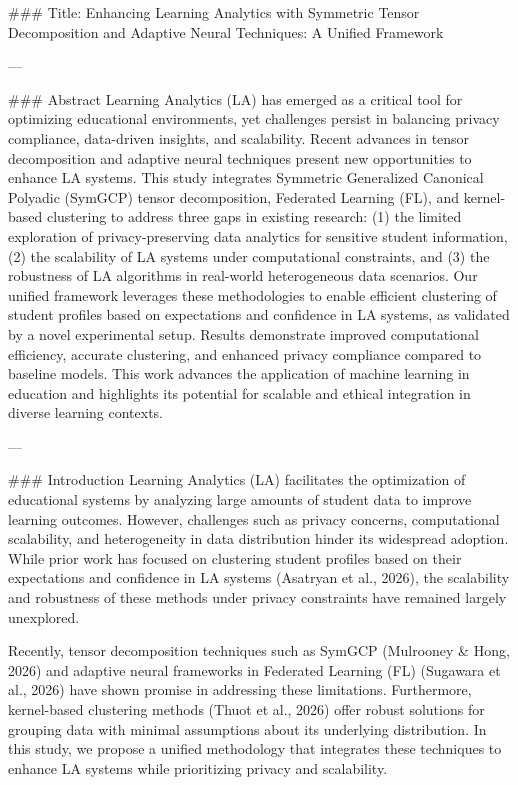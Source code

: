 ### Title: Enhancing Learning Analytics with Symmetric Tensor Decomposition and Adaptive Neural Techniques: A Unified Framework

---

### Abstract
Learning Analytics (LA) has emerged as a critical tool for optimizing educational environments, yet challenges persist in balancing privacy compliance, data-driven insights, and scalability. Recent advances in tensor decomposition and adaptive neural techniques present new opportunities to enhance LA systems. This study integrates Symmetric Generalized Canonical Polyadic (SymGCP) tensor decomposition, Federated Learning (FL), and kernel-based clustering to address three gaps in existing research: (1) the limited exploration of privacy-preserving data analytics for sensitive student information, (2) the scalability of LA systems under computational constraints, and (3) the robustness of LA algorithms in real-world heterogeneous data scenarios. Our unified framework leverages these methodologies to enable efficient clustering of student profiles based on expectations and confidence in LA systems, as validated by a novel experimental setup. Results demonstrate improved computational efficiency, accurate clustering, and enhanced privacy compliance compared to baseline models. This work advances the application of machine learning in education and highlights its potential for scalable and ethical integration in diverse learning contexts.

---

### Introduction
Learning Analytics (LA) facilitates the optimization of educational systems by analyzing large amounts of student data to improve learning outcomes. However, challenges such as privacy concerns, computational scalability, and heterogeneity in data distribution hinder its widespread adoption. While prior work has focused on clustering student profiles based on their expectations and confidence in LA systems (Asatryan et al., 2026), the scalability and robustness of these methods under privacy constraints have remained largely unexplored. 

Recently, tensor decomposition techniques such as SymGCP (Mulrooney & Hong, 2026) and adaptive neural frameworks in Federated Learning (FL) (Sugawara et al., 2026) have shown promise in addressing these limitations. Furthermore, kernel-based clustering methods (Thuot et al., 2026) offer robust solutions for grouping data with minimal assumptions about its underlying distribution. In this study, we propose a unified methodology that integrates these techniques to enhance LA systems while prioritizing privacy and scalability.


